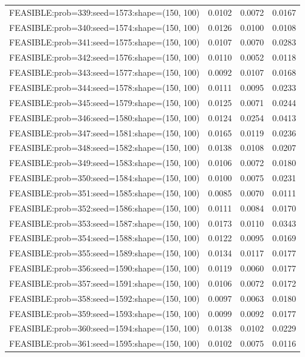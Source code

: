 \begin{longtable}{lccc}
FEASIBLE:prob=339:seed=1573:shape=(150, 100) &   0.0102 & 0.0072 & 0.0167 \\
FEASIBLE:prob=340:seed=1574:shape=(150, 100) &   0.0126 & 0.0100 & 0.0108 \\
FEASIBLE:prob=341:seed=1575:shape=(150, 100) &   0.0107 & 0.0070 & 0.0283 \\
FEASIBLE:prob=342:seed=1576:shape=(150, 100) &   0.0110 & 0.0052 & 0.0118 \\
FEASIBLE:prob=343:seed=1577:shape=(150, 100) &   0.0092 & 0.0107 & 0.0168 \\
FEASIBLE:prob=344:seed=1578:shape=(150, 100) &   0.0111 & 0.0095 & 0.0233 \\
FEASIBLE:prob=345:seed=1579:shape=(150, 100) &   0.0125 & 0.0071 & 0.0244 \\
FEASIBLE:prob=346:seed=1580:shape=(150, 100) &   0.0124 & 0.0254 & 0.0413 \\
FEASIBLE:prob=347:seed=1581:shape=(150, 100) &   0.0165 & 0.0119 & 0.0236 \\
FEASIBLE:prob=348:seed=1582:shape=(150, 100) &   0.0138 & 0.0108 & 0.0207 \\
FEASIBLE:prob=349:seed=1583:shape=(150, 100) &   0.0106 & 0.0072 & 0.0180 \\
FEASIBLE:prob=350:seed=1584:shape=(150, 100) &   0.0100 & 0.0075 & 0.0231 \\
FEASIBLE:prob=351:seed=1585:shape=(150, 100) &   0.0085 & 0.0070 & 0.0111 \\
FEASIBLE:prob=352:seed=1586:shape=(150, 100) &   0.0111 & 0.0084 & 0.0170 \\
FEASIBLE:prob=353:seed=1587:shape=(150, 100) &   0.0173 & 0.0110 & 0.0343 \\
FEASIBLE:prob=354:seed=1588:shape=(150, 100) &   0.0122 & 0.0095 & 0.0169 \\
FEASIBLE:prob=355:seed=1589:shape=(150, 100) &   0.0134 & 0.0117 & 0.0177 \\
FEASIBLE:prob=356:seed=1590:shape=(150, 100) &   0.0119 & 0.0060 & 0.0177 \\
FEASIBLE:prob=357:seed=1591:shape=(150, 100) &   0.0106 & 0.0072 & 0.0172 \\
FEASIBLE:prob=358:seed=1592:shape=(150, 100) &   0.0097 & 0.0063 & 0.0180 \\
FEASIBLE:prob=359:seed=1593:shape=(150, 100) &   0.0099 & 0.0092 & 0.0177 \\
FEASIBLE:prob=360:seed=1594:shape=(150, 100) &   0.0138 & 0.0102 & 0.0229 \\
FEASIBLE:prob=361:seed=1595:shape=(150, 100) &   0.0102 & 0.0075 & 0.0116 \\

\end{longtable}
